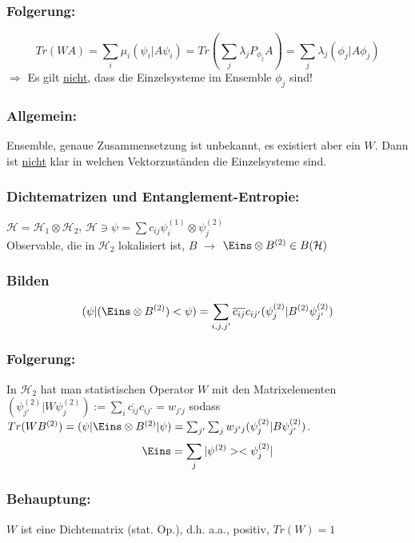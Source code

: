 \documentclass[twoside,a4paper]{scrartcl}
\renewcommand{\1}{\mathds{1}}
\newcommand{\Ra}{\Rightarrow}
\newcommand{\ra}{\rightarrow}
\renewcommand{\l}{\lambda}
\renewcommand{\H}{\mathcal{H}}
\begin{document}
\subsubsection*{Folgerung:} 
$$Tr(WA)=\sum_i \mu_i (\psi_i|A\psi_i)=Tr(\sum_j \l_j P_{\phi_j}A)=\sum_j \l_j (\phi_j|A\phi_j)$$
$\Ra$ Es gilt \underline{nicht}, dass die Einzelsysteme im Ensemble $\phi_j$ sind!
\subsubsection*{Allgemein:} 
Ensemble, genaue Zusammensetzung ist unbekannt, es existiert aber ein $W$. Dann ist \underline{nicht} klar in welchen Vektorzuständen die Einzelsysteme sind.

\subsubsection*{Dichtematrizen und Entanglement-Entropie:} 
$\H=\H_1 \otimes \H_2$, $\H \ni \psi=\sum c_{ij} \psi_i^{(1)}\otimes \psi_j^{(2)}$\\
Observable, die in $\H_2$ lokalisiert ist, $B$ $\ra$ $\Eins \otimes B^{(2)} \in B(\H)$
\subsubsection*{Bilden}
$$(\psi|(\Eins \otimes B^{(2)} )<\psi)=\sum_{i,j,j'} \overline{c_{ij}}c_{ij'}(\psi_j^{(2)}|B^{(2)}\psi_{j'}^{(2)})$$
\subsubsection*{Folgerung:} 
In $\H_2$ hat man statistischen Operator $W$ mit den Matrixelementen $(\psi_{j'}^{(2)}|W\psi_{j}^{(2)}):=\sum_i \overline{c_{ij}}c_{ij'}=w_{j'j}$ sodass $Tr(WB^{(2)})=(\psi|\Eins \otimes B^{(2)}|\psi)=\sum_{j'} \sum_j w_{j'j}(\psi_{j}^{(2)}|B\psi_{j'}^{(2)})$.\\
$$\Eins=\sum_j |\psi^{(2)}><\psi_j^{(2)}|$$
\subsubsection*{Behauptung:}
$W$ ist eine Dichtematrix (stat. Op.), d.h. a.a., positiv, $Tr(W)=1$
\end{document}
